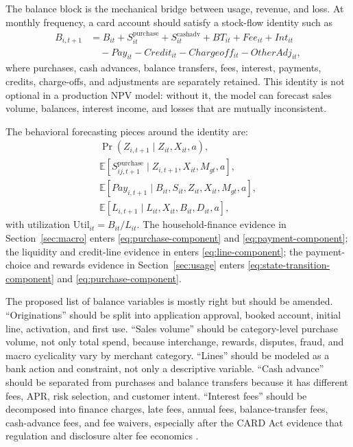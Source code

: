 \documentclass[11pt]{article}
\newcommand{\E}{\mathbb{E}}
\newcommand{\1}{\mathbf{1}}
\begin{document}
The balance block is the mechanical bridge between usage, revenue, and loss.
At monthly frequency, a card account should satisfy a stock-flow identity such
as
\begin{align}
  B_{i,t+1}
  &=
  B_{it}
  + S^{\mathrm{purchase}}_{it}
  + S^{\mathrm{cashadv}}_{it}
  + BT_{it}
  + Fee_{it}
  + Int_{it} \nonumber\\
  &\quad
  - Pay_{it}
  - Credit_{it}
  - Chargeoff_{it}
  - OtherAdj_{it},
  \label{eq:balance-stock-flow}
\end{align}
where purchases, cash advances, balance transfers, fees, interest, payments,
credits, charge-offs, and adjustments are separately retained. This identity is
not optional in a production NPV model: without it, the model can forecast
sales volume, balances, interest income, and losses that are mutually
inconsistent.

The behavioral forecasting pieces around the identity are:
\begin{align}
  \Pr(Z_{i,t+1}\mid Z_{it},X_{it},a), \label{eq:state-transition-component}\\
  \E[S^{\mathrm{purchase}}_{ij,t+1}\mid Z_{i,t+1},X_{it},M_{gt},a], \label{eq:purchase-component}\\
  \E[Pay_{i,t+1}\mid B_{it},S_{it},Z_{it},X_{it},M_{gt},a], \label{eq:payment-component}\\
  \E[L_{i,t+1}\mid L_{it},X_{it},B_{it},D_{it},a], \label{eq:line-component}
\end{align}
with utilization $\mathrm{Util}_{it}=B_{it}/L_{it}$. The household-finance
evidence in Section~\ref{sec:macro} enters \eqref{eq:purchase-component} and
\eqref{eq:payment-component}; the liquidity and credit-line evidence in
\citet{gross2001liquidity} enters \eqref{eq:line-component}; the payment-choice
and rewards evidence in Section~\ref{sec:usage} enters
\eqref{eq:state-transition-component} and \eqref{eq:purchase-component}.

The proposed list of balance variables is mostly right but should be amended.
``Originations'' should be split into application approval, booked account,
initial line, activation, and first use. ``Sales volume'' should be
category-level purchase volume, not only total spend, because interchange,
rewards, disputes, fraud, and macro cyclicality vary by merchant category.
``Lines'' should be modeled as a bank action and constraint, not only a
descriptive variable. ``Cash advance'' should be separated from purchases and
balance transfers because it has different fees, APR, risk selection, and
customer intent. ``Interest fees'' should be decomposed into finance charges,
late fees, annual fees, balance-transfer fees, cash-advance fees, and fee
waivers, especially after the CARD Act evidence that regulation and disclosure
alter fee economics \citep{agarwal2013cardact}.
\end{document}
